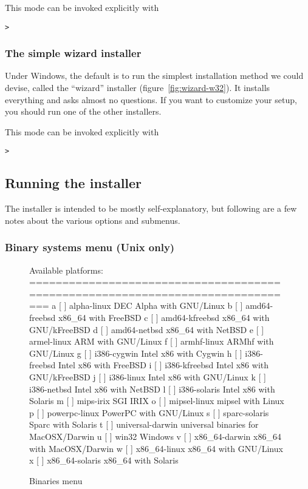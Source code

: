 \documentclass{article}
\begin{document}
This mode can be invoked explicitly with
\begin{alltt}
> 
\end{alltt}


\subsubsection{The simple wizard installer}

Under Windows, the default is to run the simplest installation method we
could devise, called the ``wizard'' installer
(figure~\ref{fig:wizard-w32}).  It installs everything and asks almost
no questions.  If you want to customize your setup, you should run one
of the other installers.

This mode can be invoked explicitly with
\begin{alltt}
> 
\end{alltt}


\subsection{Running the installer}
\label{sec:runinstall}

The installer is intended to be mostly self-explanatory, but following are a
few notes about the various options and submenus.

\subsubsection{Binary systems menu (Unix only)}
\label{sec:binary}

\begin{figure}[tb]
\begin{boxedverbatim}
Available platforms:
===============================================================================
   a [ ] alpha-linux      DEC Alpha with GNU/Linux
   b [ ] amd64-freebsd    x86_64 with FreeBSD
   c [ ] amd64-kfreebsd   x86_64 with GNU/kFreeBSD
   d [ ] amd64-netbsd     x86_64 with NetBSD
   e [ ] armel-linux      ARM with GNU/Linux
   f [ ] armhf-linux      ARMhf with GNU/Linux
   g [ ] i386-cygwin      Intel x86 with Cygwin
   h [ ] i386-freebsd     Intel x86 with FreeBSD
   i [ ] i386-kfreebsd    Intel x86 with GNU/kFreeBSD
   j [ ] i386-linux       Intel x86 with GNU/Linux
   k [ ] i386-netbsd      Intel x86 with NetBSD
   l [ ] i386-solaris     Intel x86 with Solaris
   m [ ] mips-irix        SGI IRIX
   o [ ] mipsel-linux     mipsel with Linux
   p [ ] powerpc-linux    PowerPC with GNU/Linux
   s [ ] sparc-solaris    Sparc with Solaris
   t [ ] universal-darwin universal binaries for MacOSX/Darwin
   u [ ] win32            Windows
   v [ ] x86_64-darwin    x86_64 with MacOSX/Darwin
   w [ ] x86_64-linux     x86_64 with GNU/Linux
   x [ ] x86_64-solaris   x86_64 with Solaris
\end{boxedverbatim}
\caption{Binaries menu}\label{fig:bin-text}
\end{figure}
\end{document}
